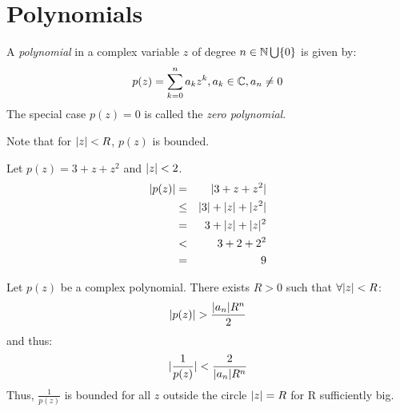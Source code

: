 \documentclass[letterpaper,12pt,fleqn]{article}
\begin{document}
\section*{Polynomials}
\begin{definition}
A \emph{polynomial} in a complex variable $z$ of degree $n\in\mathbb{N}\bigcup\{0\}$ is
given by:
\[p(z)=\sum_{k=0}^{n}a_kz^k, a_k\in\mathbb{C}, a_n\ne0\]
The special case $p(z)=0$ is called the \emph{zero polynomial}.
\end{definition}
Note that for $\lvert z\rvert<R$, $p(z)$ is bounded.
\begin{example}
Let $p(z)=3+z+z^2$ and $\lvert z\rvert<2$.
\begin{eqnarray*}
\lvert p(z)\rvert &=& \lvert3+z+z^2\rvert \\
    &\le& \lvert3\rvert+\lvert z\rvert+\lvert z^2\rvert \\
    &=& 3+\lvert z\rvert+\lvert z\rvert^2 \\
    &<& 3+2+2^2 \\
    &=& 9 \\
\end{eqnarray*}
\end{example}
\begin{theorem}
Let $p(z)$ be a complex polynomial. There exists $R>0$ such that
$\forall \lvert z\rvert<R$:
\[\lvert p(z)\rvert>\frac{\lvert a_n\rvert R^n}{2}\]
and thus:
\[\lvert\frac{1}{p(z)}\rvert<\frac{2}{\lvert a_n\rvert R^n}\]
Thus, $\frac{1}{p(z)}$ is bounded for all $z$ outside the circle
$\lvert z\rvert=R$ for R sufficiently big.
\end{theorem}
\end{document}
